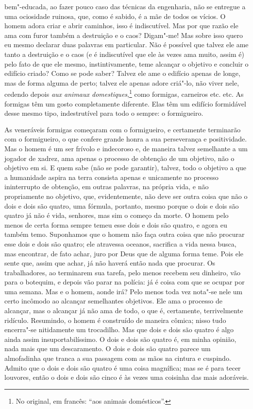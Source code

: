 bem"-educada, ao fazer pouco caso das técnicas da engenharia, não se entregue a
uma ociosidade ruinosa, que, como é sabido, é a mãe de todos os vícios. O homem
adora criar e abrir caminhos, isso é indiscutível. Mas por que razão ele ama
com furor também a destruição e o caos? Digam"-me! Mas sobre isso quero eu mesmo
declarar duas palavras em particular. Não é possível que talvez ele ame tanto a
destruição e o caos (e é indiscutível que ele às vezes ama muito, assim é) pelo
fato de que ele mesmo, instintivamente, teme alcançar o objetivo e concluir o
edifício criado? Como se pode saber? Talvez ele ame o edifício apenas de longe,
mas de forma alguma de perto; talvez ele apenas adore criá"-lo, não viver nele,
cedendo depois \textit{aux animaux domestiques},\footnote{ No original, em
francês: “aos animais domésticos”.} como formigas, carneiros etc. etc. As
formigas têm um gosto completamente diferente. Elas têm um edifício formidável
desse mesmo tipo, indestrutível para todo o sempre: o formigueiro.

As veneráveis formigas começaram com o formigueiro, e certamente
terminarão com o formigueiro, o que confere grande honra a sua
perseverança e positividade. Mas o homem é um ser frívolo e indecoroso
e, de maneira talvez semelhante a um jogador de xadrez, ama apenas o
processo de obtenção de um objetivo, não o objetivo em si. E quem sabe
(não se pode garantir), talvez, todo o objetivo a que a humanidade
aspira na terra consista apenas e unicamente no processo ininterrupto
de obtenção, em outras palavras, na própria vida, e não propriamente no
objetivo, que, evidentemente, não deve ser outra coisa que não o dois e
dois são quatro, uma fórmula, portanto, mesmo porque o dois e dois são
quatro já não é vida, senhores, mas sim o começo da morte. O homem pelo
menos de certa forma sempre temeu esse dois e dois são quatro, e agora
eu também temo. Suponhamos que o homem não faça outra coisa que não
procurar esse dois e dois são quatro; ele atravessa oceanos, sacrifica
a vida nessa busca, mas encontrar, de fato achar, juro por Deus que de
alguma forma teme. Pois ele sente que, assim que achar, já não haverá
então nada que procurar. Os trabalhadores, ao terminarem sua tarefa,
pelo menos recebem seu dinheiro, vão para o botequim, e depois vão
parar na polícia: já é coisa com que se ocupar por uma semana. Mas e o
homem, aonde irá? Pelo menos toda vez nota"-se nele um certo incômodo ao
alcançar semelhantes objetivos. Ele ama o processo de alcançar, mas o
alcançar já não ama de todo, o que é, certamente, terrivelmente
ridículo. Resumindo, o homem é construído de maneira cômica; nisso tudo
encerra"-se nitidamente um trocadilho. Mas que dois e dois são quatro é
algo ainda assim insuportabilíssimo. O dois e dois são quatro é, em
minha opinião, nada mais que um descaramento. O dois e dois são quatro
parece um almofadinha que tranca a sua passagem com as mãos na cintura
e cuspindo. Admito que o dois e dois são quatro é uma coisa magnífica;
mas se é para tecer louvores, então o dois e dois são cinco é às vezes
uma coisinha das mais adoráveis.

